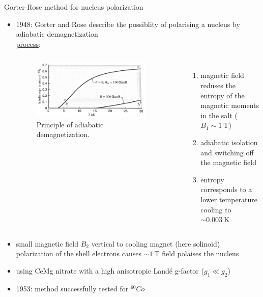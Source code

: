 \documentclass[aspectratio=1610, 10pt]{beamer}
\begin{document}
\begin{frame}{Gorter-Rose method for nucleus polarization}
	\begin{itemize}
		\item 1948: Gorter \cite{GORTER1948504} and Rose \cite{PhysRev.75.213} describe the possiblity of polarising a nucleus by adiabatic demagnetization\\
		\underline{process}:\\
		\begin{columns}
				\begin{figure}
					\center
					\includegraphics[width=0.9\textwidth]{images/adiabatic_demag.png}
					\caption{Principle of adiabatic demagnetization.\cite{kittel}}
				\end{figure}
			\begin{enumerate}
				\item magnetic field reduses the entropy of the magnetic moments in the salt ($B_{1} \sim \SI{1}{\tesla}$)
				\item adiabatic isolation and switching off the magnetic field
				\item entropy corresponds to a lower temperature \textrightarrow cooling to $\sim \SI{0.003}{\kelvin}$
			\end{enumerate}
		\end{columns}
		\item small magnetic field $B_{2}$ vertical to cooling magnet (here solinoid)\\
		\textrightarrow polarization of the shell electrons causes $\sim \SI{1}{\tesla}$ field \textrightarrow polaises the nucleus
		\item using CeMg nitrate with a high anisotropic Landé g-factor ($g_{1} \ll g_{2}$)
		\item 1953: method successfully tested for $^{60}Co$ \cite{doi:10.1080/14786440208520296}
	\end{itemize}
\end{frame}
\end{document}
